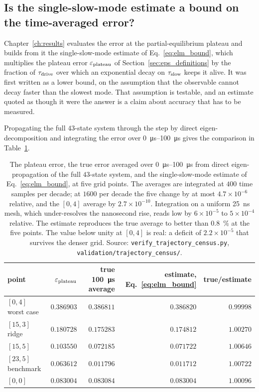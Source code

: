 \subsection{Is the single-slow-mode estimate a bound on the time-averaged error?}

Chapter~\ref{ch:results} evaluates the error at the partial-equilibrium plateau
and builds from it the single-slow-mode estimate of Eq.~\eqref{eq:elm_bound},
which multiplies the plateau error $\varepsilon_{\mathrm{plateau}}$ of
Section~\ref{sec:eps_definitions} by the fraction of $\tau_{\mathrm{drive}}$ over which an
exponential decay on $\tau_{\mathrm{slow}}$ keeps it alive. It was first written as a lower
bound, on the assumption that the observable cannot decay faster than the
slowest mode. That assumption is testable, and an estimate quoted as though it
were the answer is a claim about accuracy that has to be measured.

Propagating the full $43$-state system through the step by direct
eigen-decomposition and integrating the error over \SIrange{0}{100}{\micro\second}
gives the comparison in Table~\ref{tab:lowerbound}.

\begin{table}[tbp]
  \centering
  \caption[Accuracy of the single-slow-mode estimate]{The plateau error, the
  true error averaged over \SIrange{0}{100}{\micro\second} from direct
  eigen-propagation of the full $43$-state system, and the single-slow-mode
  estimate of Eq.~\eqref{eq:elm_bound}, at five grid points. The averages are
  integrated at $400$ time samples per decade; at $1600$ per decade the five
  change by at most $4.7\times10^{-6}$ relative, and the $[0,4]$ average by
  $2.7\times10^{-10}$. Integration on a uniform \SI{25}{\nano\second} mesh, which
  under-resolves the nanosecond rise, reads low by $6\times10^{-5}$ to
  $5\times10^{-4}$ relative. The estimate reproduces
  the true average to better than \SI{0.8}{\percent} at the five points. The
  value below unity at $[0,4]$ is real: a deficit of $2.2\times10^{-5}$ that
  survives the denser grid. Source: \texttt{verify\_trajectory\_census.py},
  \texttt{validation/trajectory\_census/}.}
  \label{tab:lowerbound}
  \begin{tabular}{lrrrr}
    \toprule
    point & $\varepsilon_{\mathrm{plateau}}$ & true \SI{100}{\micro\second} average & estimate, Eq.~\eqref{eq:elm_bound} & true/estimate \\
    \midrule
    $[0,4]$ worst case & $0.386903$ & $0.386811$ & $0.386820$ & $0.99998$ \\
    $[15,3]$ ridge     & $0.180728$ & $0.175283$ & $0.174812$ & $1.00270$ \\
    $[15,5]$           & $0.103550$ & $0.072185$ & $0.071722$ & $1.00646$ \\
    $[23,5]$ benchmark & $0.063612$ & $0.011796$ & $0.011712$ & $1.00722$ \\
    $[0,0]$            & $0.083004$ & $0.083084$ & $0.083004$ & $1.00096$ \\
    \bottomrule
  \end{tabular}
\end{table}

